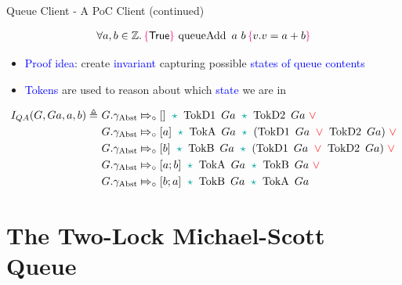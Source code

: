 \documentclass[9pt,xcolor={dvipsnames}]{beamer}
\newcommand{\queueAdd}{\operatorname{queueAdd}}
\newcommand{\QueueAddInvariant}{I_{QA}}
\newcommand{\Qg}{G}
\newcommand{\QAg}{Ga}
\newcommand{\gabst}{\gname_{\mathrm{Abst}}}
\newcommand{\TokDo}[1]{\operatorname{TokD1} ~ #1}
\newcommand{\TokDoQAg}{\TokDo{\QAg}}
\newcommand{\TokDt}[1]{\operatorname{TokD2} ~ #1}
\newcommand{\TokDtQAg}{\TokDt{\QAg}}
\newcommand{\TokA}[1]{\operatorname{TokA} ~ #1}
\newcommand{\TokAQAg}{\TokA{\QAg}}
\newcommand{\TokB}[1]{\operatorname{TokB} ~ #1}
\newcommand{\TokBQAg}{\TokB{\QAg}}
\newcommand{\abstractstatefullfrag}[2]{#1 \Mapsto_{\circ} #2}
\let\oldlor\lor
\renewcommand{\lor}{\begingroup \color{red} \oldlor \endgroup}
\let\oldstar\star
\renewcommand{\star}{\begingroup \color{Emerald} \oldstar \endgroup}
\begin{document}
\begin{frame}[fragile]{Queue Client - A PoC Client (continued)}
  \begin{lemma}\label{QueueSpecs:spec:queueadd}
    \setlength\abovedisplayskip{-8pt}
    \setlength\belowdisplayskip{2pt}
    \begin{align*}
      \All a, b \in \mathbb{Z} . \hoare{\TRUE}{\queueAdd \ a \ b}{v . v = a + b}
    \end{align*}
  \end{lemma}
  \begin{itemize}
    \item \textcolor{blue}{Proof idea}: create \textcolor{blue}{invariant} capturing possible \textcolor{blue}{states of queue contents}
    \item \textcolor{blue}{Tokens} are used to reason about which \textcolor{blue}{state} we are in
  \end{itemize}
  \begin{definition}\label{QueueSpecs:queueadd:invariant}
    \setlength\abovedisplayskip{-8pt}
    \setlength\belowdisplayskip{2pt}
    \begin{align*}
      \QueueAddInvariant(\Qg, \QAg, a, b) \eqdef~
      &\abstractstatefullfrag{\Qg.\gabst}{[]}~\star~\TokDoQAg~\star~\TokDtQAg~\lor\\
      &\abstractstatefullfrag{\Qg.\gabst}{[a]}~\star~\TokAQAg~\star~(\TokDoQAg~\lor~\TokDtQAg)~\lor\\
      &\abstractstatefullfrag{\Qg.\gabst}{[b]}~\star~\TokBQAg~\star~(\TokDoQAg~\lor~\TokDtQAg)~\lor\\
      &\abstractstatefullfrag{\Qg.\gabst}{[a; b]}~\star~\TokAQAg~\star~\TokBQAg~\lor\\
      &\abstractstatefullfrag{\Qg.\gabst}{[b; a]}~\star~\TokBQAg~\star~\TokAQAg~
    \end{align*}
  \end{definition}
\end{frame}


\section{The Two-Lock Michael-Scott Queue}
\end{document}
